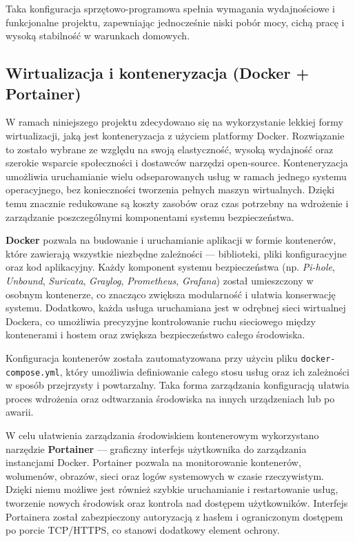 \documentclass[
    left=2.5cm,         %
    right=2.5cm,        %
    top=2.5cm,          %
    bottom=3cm,         %
    bindingoffset=6mm,  %
    nohyphenation=true %
]{eiti/eiti-thesis} %
\begin{document}
Taka konfiguracja sprzętowo-programowa spełnia wymagania wydajnościowe i funkcjonalne projektu, zapewniając jednocześnie niski pobór mocy, cichą pracę i wysoką stabilność w warunkach domowych.

\subsection{Wirtualizacja i konteneryzacja (Docker + Portainer)}

W ramach niniejszego projektu zdecydowano się na wykorzystanie lekkiej formy wirtualizacji, jaką jest konteneryzacja z użyciem platformy Docker. Rozwiązanie to zostało wybrane ze względu na swoją elastyczność, wysoką wydajność oraz szerokie wsparcie społeczności i dostawców narzędzi open-source. Konteneryzacja umożliwia uruchamianie wielu odseparowanych usług w ramach jednego systemu operacyjnego, bez konieczności tworzenia pełnych maszyn wirtualnych. Dzięki temu znacznie redukowane są koszty zasobów oraz czas potrzebny na wdrożenie i zarządzanie poszczególnymi komponentami systemu bezpieczeństwa.

\textbf{Docker} pozwala na budowanie i uruchamianie aplikacji w formie kontenerów, które zawierają wszystkie niezbędne zależności — biblioteki, pliki konfiguracyjne oraz kod aplikacyjny. Każdy komponent systemu bezpieczeństwa (np. \textit{Pi-hole}, \textit{Unbound}, \textit{Suricata}, \textit{Graylog}, \textit{Prometheus}, \textit{Grafana}) został umieszczony w osobnym kontenerze, co znacząco zwiększa modularność i ułatwia konserwację systemu. Dodatkowo, każda usługa uruchamiana jest w odrębnej sieci wirtualnej Dockera, co umożliwia precyzyjne kontrolowanie ruchu sieciowego między kontenerami i hostem oraz zwiększa bezpieczeństwo całego środowiska.

Konfiguracja kontenerów została zautomatyzowana przy użyciu pliku \texttt{docker-compose.yml}, który umożliwia definiowanie całego stosu usług oraz ich zależności w sposób przejrzysty i powtarzalny. Taka forma zarządzania konfiguracją ułatwia proces wdrożenia oraz odtwarzania środowiska na innych urządzeniach lub po awarii.

W celu ułatwienia zarządzania środowiskiem kontenerowym wykorzystano narzędzie \textbf{Portainer} — graficzny interfejs użytkownika do zarządzania instancjami Docker. Portainer pozwala na monitorowanie kontenerów, wolumenów, obrazów, sieci oraz logów systemowych w czasie rzeczywistym. Dzięki niemu możliwe jest również szybkie uruchamianie i restartowanie usług, tworzenie nowych środowisk oraz kontrola nad dostępem użytkowników. Interfejs Portainera został zabezpieczony autoryzacją z hasłem i ograniczonym dostępem po porcie TCP/HTTPS, co stanowi dodatkowy element ochrony.
\end{document}
